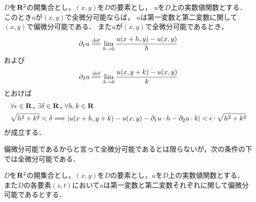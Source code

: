 	\begin{screen}
		\begin{thm}[全微分可能なら偏微分可能]
			$D$を$\mathbf{R}^2$の開集合とし，$(x,y)$を$D$の要素とし，
			$u$を$D$上の実数値関数とする．このとき$u$が$(x,y)$で全微分可能ならば，
			$u$は第一変数と第二変数に関して$(x,y)$で偏微分可能である．
			また$u$が$(x,y)$で全微分可能であるとき，
			\begin{align}
				\partial_1 u \defeq \lim_{h \to 0} \frac{u(x+h,y) - u(x,y)}{h}
			\end{align}
			および
			\begin{align}
				\partial_2 u \defeq \lim_{k \to 0} \frac{u(x,y+k) - u(x,y)}{k}
			\end{align}
			とおけば
			\begin{align}
				&\forall \epsilon \in \mathbf{R}_+\, \exists \delta \in \mathbf{R}_+\, \forall h,k \in \mathbf{R}\, \\
				&\sqrt{h^2 + k^2} < \delta \Longrightarrow
				\left|u(x+h,y+k) - u(x,y) - \partial_1 u \cdot h - \partial_2 u \cdot k\right| 
				< \epsilon \cdot \sqrt{h^2 + k^2}
			\end{align}
			が成立する．
		\end{thm}
	\end{screen}
	
	偏微分可能であるからと言って全微分可能であるとは限らないが，次の条件の下では全微分可能である．
	
	\begin{screen}
		\begin{thm}[偏導関数が連続なら全微分可能]
			$D$を$\mathbf{R}^2$の開集合とし，$(x,y)$を$D$の要素とし，$u$を$D$上の実数値関数とする．
			また$D$の各要素$(s,t)$において$u$は第一変数と第二変数それぞれに関して偏微分可能であるとする．
			
		\end{thm}
	\end{screen}

